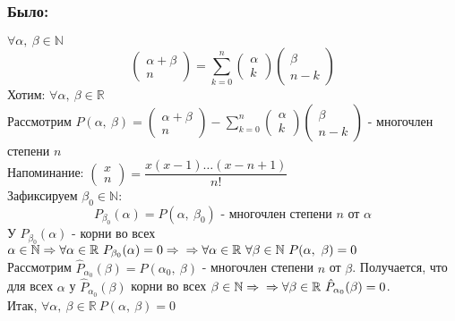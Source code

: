 \documentclass[12pt, letterpaper, twoside]{article}
\newcommand{\mb}[1]{\mathbb{#1}}
\begin{document}
    \subsubsection*{Было:}
    $\forall \alpha,\ \beta \in \mb{N}$
    \[\begin{pmatrix}
        \alpha + \beta\\
         n
    \end{pmatrix} = \sum_{k = 0}^{n} \begin{pmatrix}
        \alpha\\
        k
    \end{pmatrix}\begin{pmatrix}
        \beta\\
        n - k
    \end{pmatrix}\]
    Хотим: $\forall \alpha,\ \beta \in \mathbb{R}$\\
    Рассмотрим $P(\alpha,\ \beta) = \begin{pmatrix}
        \alpha + \beta\\
        n
    \end{pmatrix} - \sum_{k = 0}^{n}\begin{pmatrix}
        \alpha\\
        k
    \end{pmatrix} \begin{pmatrix}
        \beta\\
        n - k
    \end{pmatrix}$ - многочлен степени $n$\\
    Напоминание: $\begin{pmatrix}
        x\\
        n
    \end{pmatrix} = \dfrac{x(x - 1)\dots(x - n + 1)}{n!}$\\
    Зафиксируем $\beta_0\in \mathbb{N}$:
    \[P_{\beta_0}(\alpha) = P(\alpha,\ \beta_0)\text{ - многочлен степени $n$ от $\alpha$}\]
    У $P_{\beta_0}(\alpha)$ - корни во всех $\alpha \in \mathbb{N}\Rightarrow \forall \alpha \in \mathbb{R}\ P_{\beta_0}(\alpha) = 0\Rightarrow\\
    \Rightarrow \forall \alpha\in \mathbb{R}\ \forall \beta \in \mathbb{N}\ P(\alpha,\ \beta) = 0$\\
    Рассмотрим $\hat{P}_{\alpha_0}(\beta) = P(\alpha_0,\ \beta)$ - многочлен степени $n$ от $\beta$. Получается, что для всех $\alpha$ у $\hat{P}_{\alpha_0}(\beta)$ корни во всех $\beta\in \mathbb{N}\Rightarrow\\
    \Rightarrow \forall \beta\in \mathbb{R}\ \hat{P}_{\alpha_0}(\beta) = 0$.\\
    Итак, $\forall \alpha,\ \beta\in \mathbb{R}\ P(\alpha,\ \beta) = 0$\\
\end{document}
